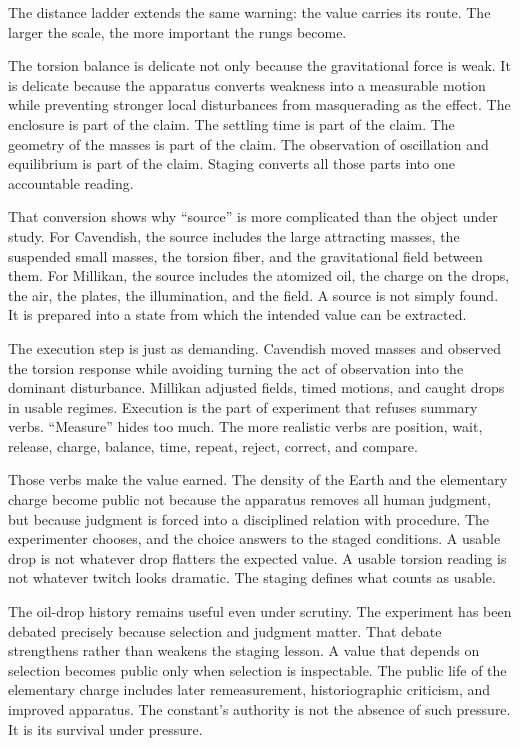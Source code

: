 The distance ladder extends the same warning: the value carries its route.
The larger the scale, the more important the rungs become.

The torsion balance is delicate not only because the gravitational force is
weak. It is delicate because the apparatus converts weakness into a
measurable motion while preventing stronger local disturbances from
masquerading as the effect. The enclosure is part of the claim. The settling
time is part of the claim. The geometry of the masses is part of the claim.
The observation of oscillation and equilibrium is part of the claim. Staging
converts all those parts into one accountable reading.

That conversion shows why ``source'' is more complicated than the object
under study. For Cavendish, the source includes the large attracting masses,
the suspended small masses, the torsion fiber, and the gravitational field
between them. For Millikan, the source includes the atomized oil, the
charge on the drops, the air, the plates, the illumination, and the field.
A source is not simply found. It is prepared into a state from which the
intended value can be extracted.

The execution step is just as demanding. Cavendish moved masses and observed
the torsion response while avoiding turning the act of observation into the
dominant disturbance. Millikan adjusted fields, timed motions, and caught
drops in usable regimes. Execution is the part of experiment that refuses
summary verbs. ``Measure'' hides too much. The more realistic verbs are
position, wait, release, charge, balance, time, repeat, reject, correct, and
compare.

Those verbs make the value earned. The density of the Earth and the
elementary charge become public not because the apparatus removes all human
judgment, but because judgment is forced into a disciplined relation with
procedure. The experimenter chooses, and the choice answers to the staged
conditions. A usable drop is not whatever drop flatters the expected value.
A usable torsion reading is not whatever twitch looks dramatic. The staging
defines what counts as usable.

The oil-drop history remains useful even under scrutiny. The experiment has
been debated precisely because selection and judgment matter. That debate
strengthens rather than weakens the staging lesson. A value that depends on
selection becomes public only when selection is inspectable. The public life
of the elementary charge includes later remeasurement, historiographic
criticism, and improved apparatus. The constant's authority is not the
absence of such pressure. It is its survival under pressure.

